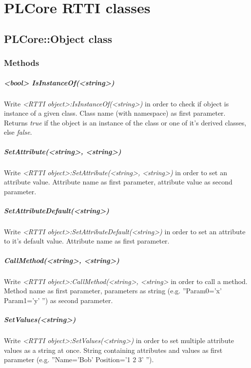 \chapter{PLCore RTTI classes}




\section{PLCore::Object class}


\subsection{Methods}

\paragraph{<bool> IsInstanceOf(<string>)}
Write \emph{<RTTI object>:IsInstanceOf(<string>)} in order to check if object is instance of a given class. Class name (with namespace) as first parameter. Returns \emph{true} if the object is an instance of the class or one of it's derived classes, else \emph{false}.

\paragraph{SetAttribute(<string>, <string>)}
Write \emph{<RTTI object>:SetAttribute(<string>, <string>)} in order to set an attribute value. Attribute name as first parameter, attribute value as second parameter.

\paragraph{SetAttributeDefault(<string>)}
Write \emph{<RTTI object>:SetAttributeDefault(<string>)} in order to set an attribute to it's default value. Attribute name as first parameter.

\paragraph{CallMethod(<string>, <string>)}
Write \emph{<RTTI object>:CallMethod(<string>, <string>} in order to call a method. Method name as first parameter, parameters as string (e.g. ''Param0='x' Param1='y' '') as second parameter.

\paragraph{SetValues(<string>)}
Write \emph{<RTTI object>:SetValues(<string>)} in order to set multiple attribute values as a string at once. String containing attributes and values as first parameter (e.g. ''Name='Bob' Position='1 2 3' '').

